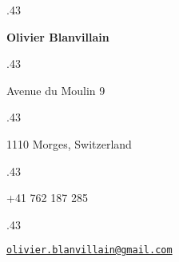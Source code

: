 \documentclass[margin, a4paper]{res}
\newcommand{\centered}[1]{\moveleft.43\hoffset\centerline{#1}}
\begin{document}
\centered{\LARGE\textbf{Olivier Blanvillain}}
\vspace{3pt}


\centered{Avenue du Moulin 9}
\centered{1110 Morges, Switzerland}
\vspace{3pt}
\centered{+41 762 187 285}
\vspace{3pt}
\centered{\href{mailto:olivier.blanvillain@gmail.com}{\texttt{olivier.blanvillain@gmail.com}}}

\begin{resume}
  
\end{resume}
\end{document}
